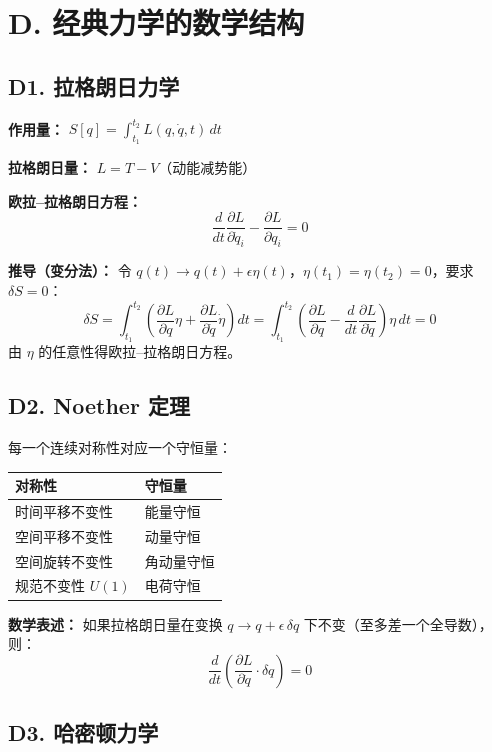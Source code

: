 \section{D. 经典力学的数学结构}

\subsection{D1. 拉格朗日力学}

\textbf{作用量：} $S[q] = \displaystyle\int_{t_1}^{t_2} L(q, \dot{q}, t)\,dt$

\textbf{拉格朗日量：} $L = T - V$（动能减势能）

\textbf{欧拉--拉格朗日方程：}
\[
\frac{d}{dt}\frac{\partial L}{\partial \dot{q}_i} - \frac{\partial L}{\partial q_i} = 0
\]

\textbf{推导（变分法）：} 令 $q(t) \to q(t) + \epsilon \eta(t)$，$\eta(t_1) = \eta(t_2) = 0$，要求 $\delta S = 0$：
\[
\delta S = \int_{t_1}^{t_2} \left(\frac{\partial L}{\partial q}\eta + \frac{\partial L}{\partial \dot{q}}\dot{\eta}\right)dt = \int_{t_1}^{t_2}\left(\frac{\partial L}{\partial q} - \frac{d}{dt}\frac{\partial L}{\partial \dot{q}}\right)\eta\,dt = 0
\]
由 $\eta$ 的任意性得欧拉--拉格朗日方程。

\subsection{D2. Noether 定理}

每一个连续对称性对应一个守恒量：

\begin{center}
\begin{tabular}{ll}
\toprule
\textbf{对称性} & \textbf{守恒量} \\
\midrule
时间平移不变性 & 能量守恒 \\
空间平移不变性 & 动量守恒 \\
空间旋转不变性 & 角动量守恒 \\
规范不变性 $U(1)$ & 电荷守恒 \\
\bottomrule
\end{tabular}
\end{center}

\textbf{数学表述：} 如果拉格朗日量在变换 $q \to q + \epsilon\,\delta q$ 下不变（至多差一个全导数），则：
\[
\frac{d}{dt}\left(\frac{\partial L}{\partial \dot{q}} \cdot \delta q\right) = 0
\]

\subsection{D3. 哈密顿力学}

